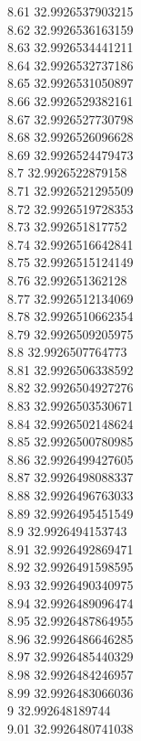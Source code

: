 {8.61	32.9926537903215\\
8.62	32.9926536163159\\
8.63	32.9926534441211\\
8.64	32.9926532737186\\
8.65	32.9926531050897\\
8.66	32.9926529382161\\
8.67	32.9926527730798\\
8.68	32.9926526096628\\
8.69	32.9926524479473\\
8.7	32.9926522879158\\
8.71	32.9926521295509\\
8.72	32.9926519728353\\
8.73	32.992651817752\\
8.74	32.9926516642841\\
8.75	32.9926515124149\\
8.76	32.992651362128\\
8.77	32.9926512134069\\
8.78	32.9926510662354\\
8.79	32.9926509205975\\
8.8	32.9926507764773\\
8.81	32.9926506338592\\
8.82	32.9926504927276\\
8.83	32.9926503530671\\
8.84	32.9926502148624\\
8.85	32.9926500780985\\
8.86	32.9926499427605\\
8.87	32.9926498088337\\
8.88	32.9926496763033\\
8.89	32.9926495451549\\
8.9	32.9926494153743\\
8.91	32.9926492869471\\
8.92	32.9926491598595\\
8.93	32.9926490340975\\
8.94	32.9926489096474\\
8.95	32.9926487864955\\
8.96	32.9926486646285\\
8.97	32.9926485440329\\
8.98	32.9926484246957\\
8.99	32.9926483066036\\
9	32.992648189744\\
9.01	32.9926480741038\\
}
